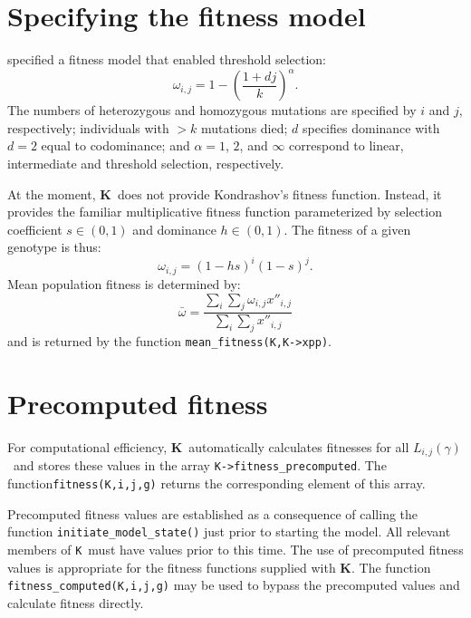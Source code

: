 \documentclass[12pt,twoside,letterpaper,fleqn]{report}
\numberwithin{equation}{section}  %
\newcommand{\K}{{\bf K}}
\newcommand{\KK}{\mbox{{\tt K}}}  %
\newcommand{\KScalar}{\mbox{\tt KScalar}}
\newcommand{\xppij}{\mbox{$x''_{i,j}$}}
\newcommand{\Lijg}{\mbox{$L_{i,j}(\gamma)$}}     %
\begin{document}
{%
\section{Specifying the fitness model}


\citet{Kondrashov:1985:5375} specified a fitness model that enabled threshold selection:
\begin{equation}\label{eqn:kondrashovfitness}
\omega_{i,j}=1-\left({\frac{1+dj}{k}}\right)^\alpha.
\end{equation}
The numbers of heterozygous and homozygous mutations are specified by $i$ and $j$, respectively; individuals with $>k$ mutations died; $d$ specifies dominance with $d=2$ equal to codominance; and $\alpha=1$, $2$, and $\infty$ correspond to linear, intermediate and threshold selection, respectively.

At the moment, \K\ does not provide Kondrashov's fitness function.  Instead, it provides the familiar multiplicative fitness function parameterized by selection coefficient $s\in(0,1)$ and dominance $h\in(0,1)$.  The fitness of a given genotype is thus:
\begin{equation}\label{eq:fitnessmultiplicative}
\omega_{i,j}=(1-hs)^{i}(1-s)^{j}.
\end{equation}
Mean population fitness is determined by:
\begin{equation}\label{eq:meanfitness}
\bar{\omega}=\frac{\sum_i{\sum_j{\omega_{i,j}\xppij}}}{\sum_i{\sum_j{\xppij}}}
\end{equation}
and is returned by the function \lstinline{mean_fitness(K,K->xpp)}.

\section{Precomputed fitness}
\label{section:precomputedfitness}

For computational efficiency, \K\ automatically calculates fitnesses for all \Lijg\ and stores these values in the array \lstinline{K->fitness_precomputed}.  The function\linebreak \lstinline{fitness(K,i,j,g)} returns the corresponding element of this array.

Precomputed fitness values are established as a consequence of calling the function \lstinline{initiate_model_state()} just prior to starting the model.  All relevant members of \KK\ must have values prior to this time.  The use of precomputed fitness values is appropriate for the fitness functions supplied with \K.  The function \lstinline{fitness_computed(K,i,j,g)} may be used to bypass the precomputed values and calculate fitness directly.

}
\end{document}
